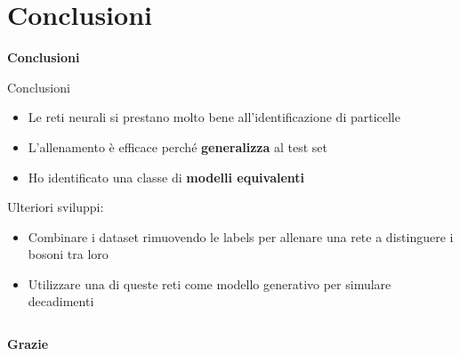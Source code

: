 \documentclass{beamer}
\begin{document}
\section{Conclusioni}
\begin{frame}
  \centering
  \Huge\bfseries
  Conclusioni
\end{frame}

\begin{frame}{Conclusioni}
  \begin{itemize}
    \item Le reti neurali si prestano molto bene all'identificazione di particelle
    \item L'allenamento è efficace perché \textbf{generalizza} al test set
    \item Ho identificato una classe di \textbf{modelli equivalenti}
  \end{itemize}
  \vspace{2ex}

  Ulteriori sviluppi: 
  \begin{itemize}
    \item Combinare i dataset rimuovendo le labels per allenare una rete a distinguere i bosoni tra loro
    \item Utilizzare una di queste reti come modello generativo per simulare decadimenti
  \end{itemize}
%
  \begin{columns}
    {
      \begin{block}{}
        \centering\vspace*{.5ex}
        \Large\bfseries
        \color{white}
        Grazie%
        \vspace*{.5ex}
      \end{block}
    }
  \end{columns}
\end{frame}
\end{document}
